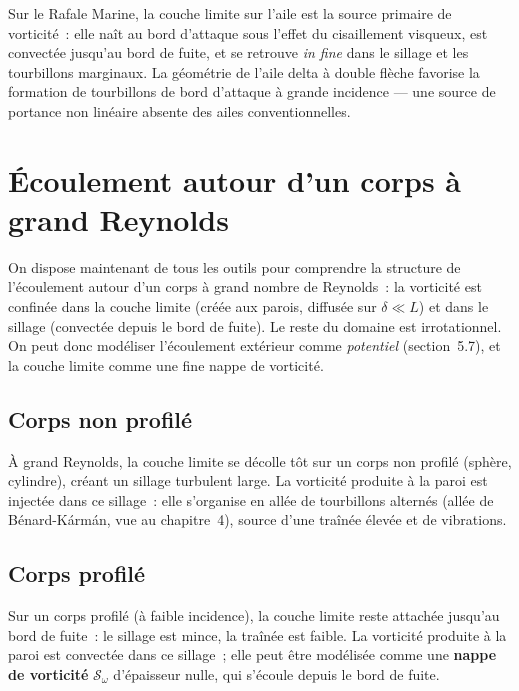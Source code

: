 \documentclass[11pt,a4paper]{report}
\begin{document}
Sur le Rafale Marine, la couche limite sur l'aile est la source primaire de vorticit\'e~: elle
na\^it au bord d'attaque sous l'effet du cisaillement visqueux, est convect\'ee jusqu'au bord
de fuite, et se retrouve \emph{in fine} dans le sillage et les tourbillons marginaux.
La g\'eom\'etrie de l'aile delta \`a double fl\`eche favorise la formation de tourbillons de
bord d'attaque \`a grande incidence --- une source de portance non lin\'eaire absente des
ailes conventionnelles.

\section{\'Ecoulement autour d'un corps \`a grand Reynolds}

On dispose maintenant de tous les outils pour comprendre la structure de l'\'ecoulement
autour d'un corps \`a grand nombre de Reynolds~: la vorticit\'e est confin\'ee dans la
couche limite (cr\'e\'ee aux parois, diffus\'ee sur $\delta \ll L$) et dans le sillage
(convect\'ee depuis le bord de fuite). Le reste du domaine est irrotationnel.
On peut donc mod\'eliser l'\'ecoulement ext\'erieur comme \emph{potentiel} (section~5.7),
et la couche limite comme une fine nappe de vorticit\'e.

\subsection{Corps non profil\'e}

\`A grand Reynolds, la couche limite se d\'ecolle t\^ot sur un corps non profil\'e (sph\`ere,
cylindre), cr\'eant un sillage turbulent large. La vorticit\'e produite \`a la paroi est
inject\'ee dans ce sillage~: elle s'organise en all\'ee de tourbillons altern\'es (all\'ee de
B\'enard-K\'arm\'an, vue au chapitre~4), source d'une tra\^in\'ee \'elev\'ee et de vibrations.

\subsection{Corps profil\'e}

Sur un corps profil\'e (\`a faible incidence), la couche limite reste attach\'ee jusqu'au bord
de fuite~: le sillage est mince, la traîn\'ee est faible. La vorticit\'e produite \`a la paroi
est convect\'ee dans ce sillage~; elle peut \^etre mod\'elis\'ee comme une \textbf{nappe de
vorticit\'e} $\mathcal{S}_\omega$ d'\'epaisseur nulle, qui s'\'ecoule depuis le bord de fuite.
\end{document}
